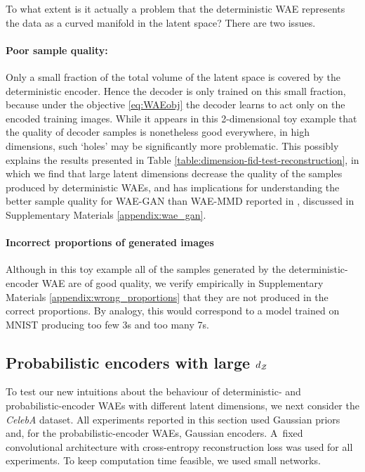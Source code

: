 To what extent is it actually a problem that the deterministic WAE represents the data as a curved manifold in the latent space? There are two issues.


\paragraph{Poor sample quality:}
Only a small fraction of the total volume of the latent space is covered by the deterministic encoder.
Hence the decoder is only trained on this small fraction, because under the objective \eqref{eq:WAEobj} the decoder learns to act only on the encoded training images. 
While it appears in this 2-dimensional toy example that the quality of decoder samples is nonetheless good everywhere, in high dimensions, such `holes' may be significantly more problematic. This possibly explains the results presented in Table \ref{table:dimension-fid-test-reconstruction}, in which we find that large latent dimensions decrease the quality of the samples produced by deterministic WAEs, and has implications for understanding the better sample quality for WAE-GAN than WAE-MMD reported in \cite{TBG+17}, discussed in Supplementary Materials \ref{appendix:wae_gan}.


\paragraph{Incorrect proportions of generated images}
Although in this toy example all of the samples generated by the deterministic-encoder WAE are of good quality, we verify empirically in Supplementary Materials \ref{appendix:wrong_proportions} that they are not produced in the correct proportions. 
By analogy, this would correspond to a model trained on MNIST producing too few 3s and too many 7s.


\subsection{\label{subsection:celebA}Probabilistic encoders with large $d_{\mathcal{Z}}$}


To test our new intuitions about the behaviour of deterministic- and probabilistic-encoder WAEs with different latent dimensions, we next consider the \emph{CelebA} dataset. 
All experiments reported in this section used Gaussian priors and, for the probabilistic-encoder WAEs, Gaussian encoders. 
A~fixed convolutional architecture with cross-entropy reconstruction loss was used for all experiments. To keep computation time feasible, we used small networks.

